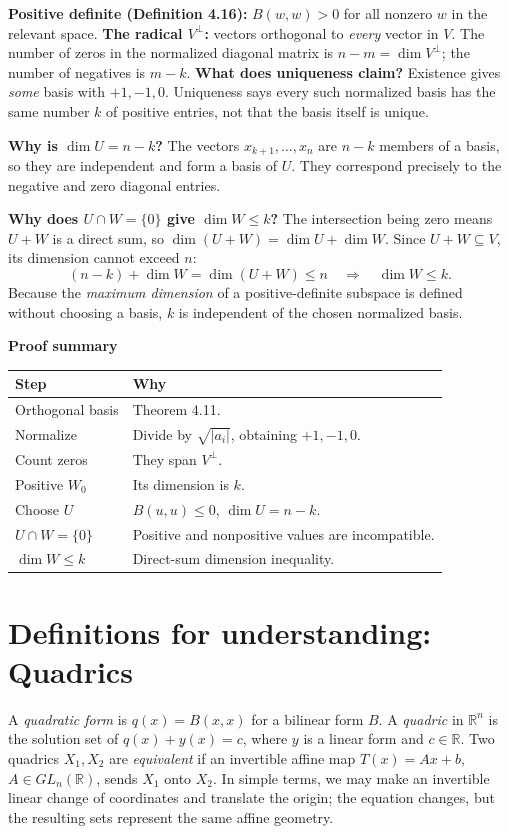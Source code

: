 \documentclass[11pt,a4paper]{article}
\newcommand{\prooftable}[1]{\medskip\textbf{Proof summary}\par\smallskip #1\medskip}
\begin{document}
\begin{personalnote}[title=Definitions for understanding]
\textbf{Positive definite (Definition 4.16):}
\(B(w,w)>0\) for all nonzero \(w\) in the relevant space.
\textbf{The radical \(V^\perp\):} vectors orthogonal to \emph{every}
vector in \(V\). The number of zeros in the normalized diagonal
matrix is \(n-m=\dim V^\perp\); the number of negatives is \(m-k\).
\textbf{What does uniqueness claim?} Existence gives \emph{some} basis
with \(+1,-1,0\). Uniqueness says every such normalized basis has
the same number \(k\) of positive entries, not that the basis itself
is unique.
\end{personalnote}
\begin{personalnote}
\textbf{Why is \(\dim U=n-k\)?}
The vectors \(x_{k+1},\ldots,x_n\) are \(n-k\) members of a basis,
so they are independent and form a basis of \(U\).
They correspond precisely to the negative and zero diagonal entries.

\textbf{Why does \(U\cap W=\{0\}\) give \(\dim W\leq k\)?}
The intersection being zero means \(U+W\) is a direct sum, so
\(\dim(U+W)=\dim U+\dim W\).
Since \(U+W\subseteq V\), its dimension cannot exceed \(n\):
\[
(n-k)+\dim W=\dim(U+W)\leq n
\quad\Longrightarrow\quad\dim W\leq k.
\]
Because the \emph{maximum dimension} of a positive-definite
subspace is defined without choosing a basis, \(k\) is independent
of the chosen normalized basis.
\end{personalnote}
\prooftable{\begin{tabularx}{\linewidth}{@{}p{.28\linewidth}X@{}}\hline
Step & Why\\\hline
Orthogonal basis & Theorem 4.11.\\
Normalize & Divide by \(\sqrt{|a_i|}\), obtaining \(+1,-1,0\).\\
Count zeros & They span \(V^\perp\).\\
Positive \(W_0\) & Its dimension is \(k\).\\
Choose \(U\) & \(B(u,u)\leq0\), \(\dim U=n-k\).\\
\(U\cap W=\{0\}\) & Positive and nonpositive values are incompatible.\\
\(\dim W\leq k\) & Direct-sum dimension inequality.\\\hline
\end{tabularx}}

\section*{Definitions for understanding: Quadrics}
A \emph{quadratic form} is \(q(x)=B(x,x)\) for a bilinear form \(B\).
A \emph{quadric} in \(\mathbb R^n\) is the solution set of
\(q(x)+y(x)=c\), where \(y\) is a linear form and \(c\in\mathbb R\).
Two quadrics \(X_1,X_2\) are \emph{equivalent} if an invertible affine map
\(T(x)=Ax+b\), \(A\in GL_n(\mathbb R)\), sends \(X_1\) onto \(X_2\).
In simple terms, we may make an invertible linear change of coordinates
and translate the origin; the equation changes, but the resulting sets
represent the same affine geometry.
\end{document}
